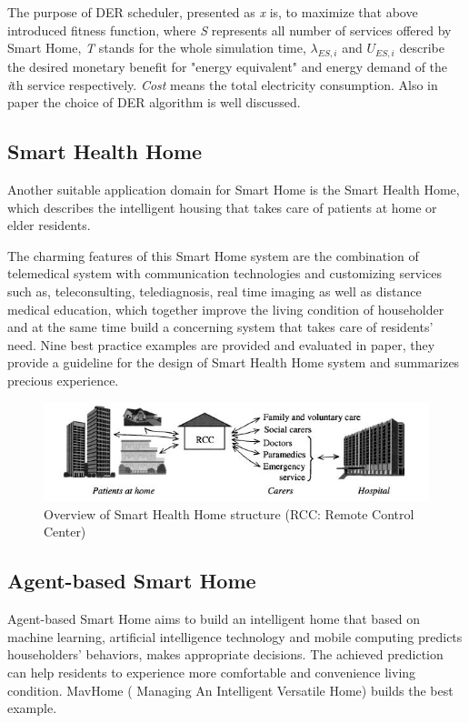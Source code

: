 The purpose of DER scheduler, presented as \emph{x} is, to maximize that above introduced fitness function, where \emph{S} represents all number of services offered by Smart Home, \emph{T} stands for the whole simulation time, $\lambda_{ES,i}$ and $ U_{ES,i}$ describe the desired monetary benefit for "energy equivalent" and energy demand of the \emph{i}th service respectively. \emph{Cost} means the total electricity consumption. Also in paper\cite{smart_home_for_energy} the choice of DER algorithm is well discussed.


\subsection{Smart Health Home}
Another suitable application domain for Smart Home is the Smart Health Home, which describes the intelligent housing that takes care of patients at home or elder residents.

The charming features of this Smart Home system are the combination of telemedical system with communication technologies and customizing services such as, teleconsulting, telediagnosis, real time imaging as well as distance medical education\cite{smart_home_for_health}, which together improve the living condition of householder and at the same time build a concerning system that takes care of residents' need. Nine best practice examples are provided and evaluated in paper\cite{smart_home_for_old}, they provide a guideline for  the design of Smart Health Home system and summarizes precious experience. 
 \begin{figure}[!htbp]
	\centering
	\includegraphics[width=1.0\textwidth]{rcc.jpg}
		\caption{Overview of Smart Health Home structure\cite{smart_home_for_health} (RCC: Remote Control Center)}
	\label{fig:rcc}
\end{figure}
\subsection{Agent-based Smart Home} \label{secAgent}
Agent-based Smart Home aims to build an intelligent home that based on machine learning, artificial intelligence technology and mobile computing predicts householders' behaviors, makes appropriate decisions. The achieved prediction can help residents to experience more comfortable and convenience living condition. MavHome ( Managing An Intelligent Versatile Home)\cite{smart_home_agent} builds the best example. 

